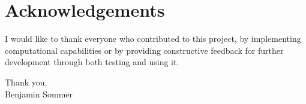 \section*{Acknowledgements}
I would like to thank everyone who contributed to this project, by implementing computational capabilities or by providing constructive feedback for further development through both testing and using it.

Thank you,\\
Benjamin Sommer
